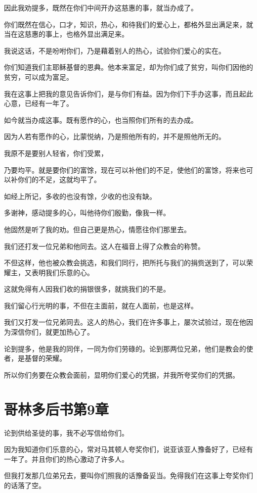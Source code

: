 \documentclass[12pt,oneside]{book}
\begin{document}
因此我劝提多，既然在你们中间开办这慈惠的事，就当办成了。

你们既然在信心，口才，知识，热心，和待我们的爱心上，都格外显出满足来，就当在这慈惠的事上，也格外显出满足来。

我说这话，不是吩咐你们，乃是藉着别人的热心，试验你们爱心的实在。

你们知道我们主耶稣基督的恩典。他本来富足，却为你们成了贫穷，叫你们因他的贫穷，可以成为富足。

我在这事上把我的意见告诉你们，是与你们有益。因为你们下手办这事，而且起此心意，已经有一年了。

如今就当办成这事。既有愿作的心，也当照你们所有的去办成。

因为人若有愿作的心，比蒙悦纳，乃是照他所有的，并不是照他所无的。

我原不是要别人轻省，你们受累，

乃要均平。就是要你们的富馀，现在可以补他们的不足，使他们的富馀，将来也可以补你们的不足，这就均平了。

如经上所记，多收的也没有馀，少收的也没有缺。

多谢神，感动提多的心，叫他待你们殷勤，像我一样。

他固然是听了我的劝。但自己更是热心，情愿往你们那里去。

我们还打发一位兄弟和他同去。这人在福音上得了众教会的称赞。

不但这样，他也被众教会挑选，和我们同行，把所托与我们的捐赀送到了，可以荣耀主，又表明我们乐意的心。

这就免得有人因我们收的捐银很多，就挑我们的不是。

我们留心行光明的事，不但在主面前，就在人面前，也是这样。

我们又打发一位兄弟同去。这人的热心，我们在许多事上，屡次试验过，现在他因为深信你们，就更加热心了。

论到提多，他是我的同伴，一同为你们劳碌的。论到那两位兄弟，他们是教会的使者，是基督的荣耀。

所以你们务要在众教会面前，显明你们爱心的凭据，并我所夸奖你们的凭据。

\chapter{哥林多后书第9章}
论到供给圣徒的事，我不必写信给你们。

因为我知道你们乐意的心，常对马其顿人夸奖你们，说亚该亚人豫备好了，已经有一年了。并且你们的热心激动了许多人。

但我打发那几位弟兄去，要叫你们照我的话豫备妥当。免得我们在这事上夸奖你们的话落了空。
\end{document}
